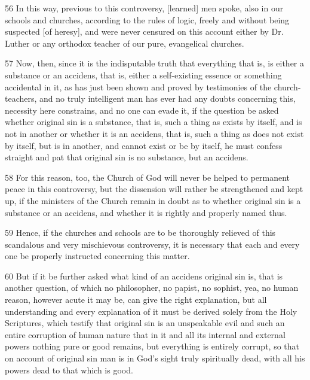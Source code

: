 56 In this way, previous to this controversy, [learned] men spoke, also in our schools and churches, according to the rules of logic, freely and without being suspected [of heresy], and were never censured on this account either by Dr. Luther or any orthodox teacher of our pure, evangelical churches.

57 Now, then, since it is the indisputable truth that everything that is, is either a substance or an accidens, that is, either a self-existing essence or something accidental in it, as has just been shown and proved by testimonies of the church-teachers, and no truly intelligent man has ever had any doubts concerning this, necessity here constrains, and no one can evade it, if the question be asked whether original sin is a substance, that is, such a thing as exists by itself, and is not in another or whether it is an accidens, that is, such a thing as does not exist by itself, but is in another, and cannot exist or be by itself, he must confess straight and pat that original sin is no substance, but an accidens.

58 For this reason, too, the Church of God will never be helped to permanent peace in this controversy, but the dissension will rather be strengthened and kept up, if the ministers of the Church remain in doubt as to whether original sin is a substance or an accidens, and whether it is rightly and properly named thus.

59 Hence, if the churches and schools are to be thoroughly relieved of this scandalous and very mischievous controversy, it is necessary that each and every one be properly instructed concerning this matter.

60 But if it be further asked what kind of an accidens original sin is, that is another question, of which no philosopher, no papist, no sophist, yea, no human reason, however acute it may be, can give the right explanation, but all understanding and every explanation of it must be derived solely from the Holy Scriptures, which testify that original sin is an unspeakable evil and such an entire corruption of human nature that in it and all its internal and external powers nothing pure or good remains, but everything is entirely corrupt, so that on account of original sin man is in God’s sight truly spiritually dead, with all his powers dead to that which is good.

